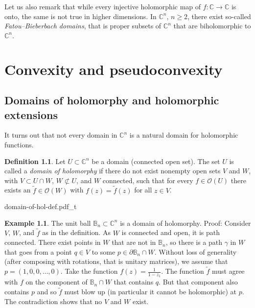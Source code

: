 \documentclass[12pt,openany]{book}
\newcommand{\C}{{\mathbb{C}}}
\newcommand{\bB}{{\mathbb{B}}}
\newcommand{\sO}{{\mathscr{O}}}
\newcommand{\myindex}[1]{#1\index{#1}}
\theoremstyle{plain}
\theoremstyle{remark}
\theoremstyle{definition}
\newtheorem{defn}[thm]{Definition}
\theoremstyle{exercise}
\theoremstyle{example}
\newtheorem{example}[thm]{Example}
\begin{document}
Let us also remark that while every injective holomorphic
map of $f \colon \C \to \C$ is onto, the same is not true in higher
dimensions.
In $\C^n$, $n \geq 2$, there exist so-called
\emph{Fatou--Bieberbach domains},
that is proper subsets of $\C^n$ that are biholomorphic to $\C^n$.



\chapter{Convexity and pseudoconvexity} \label{ch:convexity}


\section{Domains of holomorphy and holomorphic extensions}

It turns out that not every domain in $\C^n$ is a natural domain for
holomorphic functions.

\begin{defn}
Let $U \subset \C^n$ be a domain (connected open set).  The set $U$ is
called a \emph{\myindex{domain of holomorphy}} if there do not exist
nonempty open sets
$V$ and $W$, with $V \subset U \cap W$, $W \not\subset U$, and $W$
connected, such that for every $f \in \sO(U)$ there exists an $\widetilde{f} \in
\sO(W)$ with $f(z) = \widetilde{f}(z)$ for all $z \in V$.
\end{defn}


\begin{center}
{domain-of-hol-def.pdf_t}
\end{center}


\begin{example}
The unit ball $\bB_n \subset \C^n$ is a domain of holomorphy.  Proof: 
Consider $V$, $W$, and $\widetilde{f}$ as in the definition.  As $W$ is
connected and open, it is path connected.  There exist
points in $W$ that are not in $\bB_n$, so there
is a path $\gamma$ in $W$ that goes
from a point $q \in V$ to some $p \in \partial \bB_n \cap W$.
Without loss of generality (after composing with
rotations, that is unitary matrices), we assume that $p =
(1,0,0,\ldots,0)$.  Take the function $f(z) = \frac{1}{1-z_1}$.  
The function $\widetilde{f}$ must agree with $f$ on the component of
$\bB_n \cap W$ that contains $q$.  But that component also contains $p$ and
so $\widetilde{f}$ must blow up (in particular it cannot be holomorphic) at
$p$.  The contradiction shows that no $V$ and $W$ exist.
\end{example}
\end{document}
